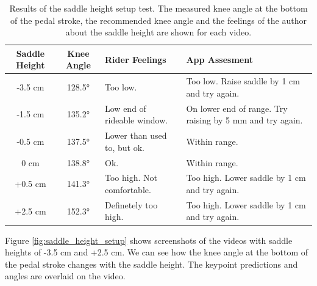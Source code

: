 \begin{table}[htbp]

    \centering
    \begin{tabular}{c c p{} p{}}
        \toprule
        Saddle Height & Knee Angle & Rider Feelings              & App Assesment                                             \\
        \midrule
        -3.5 cm       & 128.5°     & Too low.                    & Too low. Raise saddle by 1 cm and try again.              \\
        \midrule
        -1.5 cm       & 135.2°     & Low end of rideable window. & On lower end of range. Try raising by 5 mm and try again. \\
        \midrule
        -0.5 cm       & 137.5°     & Lower than used to, but ok. & Within range.                                             \\
        \midrule
        0 cm          & 138.8°     & Ok.                         & Within range.                                             \\
        \midrule
        +0.5 cm       & 141.3°     & Too high. Not comfortable.  & Too high. Lower saddle by 1 cm and try again.             \\
        \midrule
        +2.5 cm       & 152.3°     & Definetely too high.        & Too high. Lower saddle by 1 cm and try again.             \\
        \bottomrule
    \end{tabular}
    \caption{Results of the saddle height setup test. The measured knee angle at the bottom of the pedal stroke, the recommended knee angle and the feelings of the author about the saddle height are shown for each video.}
    \label{tab:saddle_height_setup}
\end{table}

Figure \ref{fig:saddle_height_setup} shows screenshots of the videos with saddle heights of -3.5 cm and +2.5 cm. We can see how the knee angle at the bottom of the pedal stroke changes with the saddle height. The keypoint predictions and angles are overlaid on the video.


